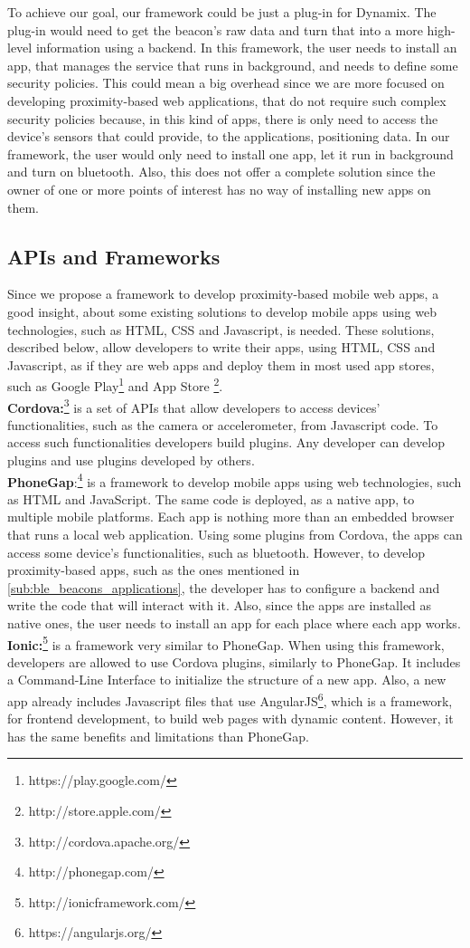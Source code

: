 To achieve our goal, our framework could be just a
plug-in for Dynamix. The plug-in would
need to get the beacon's raw data and
turn that into a more high-level information 
using a backend. In this framework,
the user needs to install an app, that manages the service
that runs in background, and needs to define some
security policies. This could mean a big overhead since
we are more focused on developing proximity-based
web applications, that do not require such complex security
policies because, in this kind of apps, there is only need
to access the device's sensors that could provide,
to the applications, positioning data. 
In our framework, the user would only need to
install one app, let it run in background and turn on
bluetooth. Also, this does not offer a complete solution
since the owner of one or more points of interest
has no way of installing new apps on them.

\subsection{APIs and Frameworks}
\label{sub:frameworks_web}
Since we propose a framework to develop proximity-based
mobile web apps, a good insight, about some existing
solutions to develop mobile apps using web technologies,
such as HTML, CSS and Javascript, is needed.
These solutions, described below, allow developers to
write their apps, using HTML, CSS and Javascript, as
if they are web apps and deploy them in most used app
stores, such as 
Google Play\footnote{https://play.google.com/}
and
App Store \footnote{http://store.apple.com/}.
\\
\textbf{Cordova:}\footnote{http://cordova.apache.org/}
is a set of APIs that allow developers to access
devices' functionalities, such as the camera or
accelerometer, from Javascript code.
To access such functionalities developers build plugins.
Any developer can develop plugins and use plugins
developed by others.
\\
\textbf{PhoneGap}:\footnote{http://phonegap.com/}
is a framework to develop mobile apps
using web technologies, such as HTML and JavaScript. The
same code is deployed, as a native app, to multiple mobile
platforms. Each app is nothing more than an embedded browser
that runs a local web application. 
Using some plugins from Cordova, the apps can access some
device's functionalities, such as bluetooth. 
However, to develop proximity-based apps, such as
the ones mentioned in 
\ref{sub:ble_beacons_applications},
the developer has to configure a backend and write the
code that will interact with it. Also, since the apps are
installed as native ones, the user needs to install
an app for each place where each app works.
\\
\textbf{Ionic:}\footnote{http://ionicframework.com/}
is a framework very similar to PhoneGap. When using
this framework, developers are allowed to use Cordova
plugins, similarly to PhoneGap. It includes a
Command-Line Interface to initialize the structure
of a new app. Also, a new app already includes Javascript
files that use 
AngularJS\footnote{https://angularjs.org/}, 
which is a framework, for frontend development,
to build web pages with dynamic content.
However, it has the same benefits and limitations
than PhoneGap.

